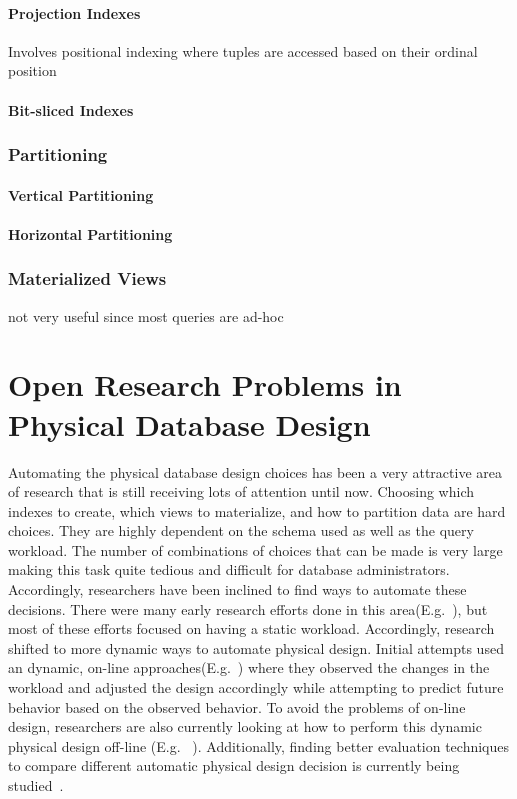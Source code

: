 \documentclass[12pt,a4paper]{article}
\begin{document}
\paragraph{Projection Indexes}
Involves positional indexing where tuples are accessed based on their ordinal position \cite{628286}

\paragraph{Bit-sliced Indexes}


\subsubsection{Partitioning}
\cite{thusoo2010data}
\paragraph{Vertical Partitioning}

\paragraph{Horizontal Partitioning}

\subsubsection{Materialized Views}
not very useful since most queries are ad-hoc \cite{653447}
\cite{355309}


\section{Open Research Problems in Physical Database Design}
\label{SEC-OPEN}

Automating the physical database design choices has been a very attractive area of research that is still receiving lots of attention until now. Choosing which
indexes to create, which views to materialize, and how to partition data are hard choices. They are highly dependent on the schema used as well
as the query workload. The number of combinations of choices that can be made is very large making this task quite tedious and difficult for database
administrators. Accordingly, researchers have been inclined to find ways to automate these decisions. There were many early research efforts done in this
area(E.g.~\cite{finkelstein1988physical, hammer76selec, frank1992selec, chaudhuri1997overview, schiefer1999db2, valentin2000select}), but most of these efforts
focused on having a static workload. Accordingly, research shifted to more dynamic ways to automate physical design. Initial attempts used an dynamic, on-line
approaches(E.g.~\cite{bruno2007online, sattler2003, schnaitter2007}) where they observed the changes in the workload and adjusted the design accordingly while
attempting to predict future behavior based on the observed behavior. To avoid the problems of on-line design, researchers are also currently looking at how to
perform this dynamic physical design off-line (E.g. ~\cite{hannes2008,agrawal2006}). Additionally, finding better evaluation techniques to compare different
automatic physical design decision is currently being studied~\cite{gebaly2008}.
\end{document}
